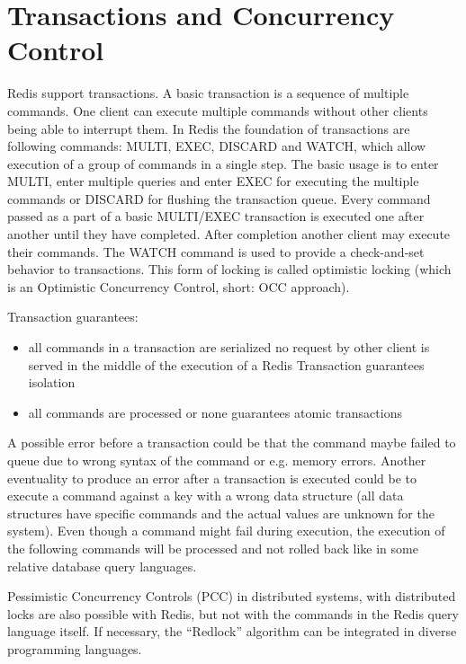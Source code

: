 \chapter{Transactions and Concurrency Control}

Redis support transactions. A basic transaction is a sequence of multiple commands. One client can execute multiple commands without other clients being able to interrupt them. In Redis the foundation of transactions are following commands: MULTI, EXEC, DISCARD and WATCH, which allow execution of a group of commands in a single step. The basic usage is to enter MULTI, enter multiple queries and enter EXEC for executing the multiple commands or  DISCARD for flushing the transaction queue. Every command passed as a part of a basic MULTI/EXEC transaction is executed one after another until they have completed. After completion another client may execute their commands. The WATCH command is used to provide a check-and-set behavior to transactions. This form of locking is called optimistic locking (which is an Optimistic Concurrency Control, short: OCC approach).

Transaction guarantees:
\begin{itemize}
	\item all commands in a transaction are serialized no request by other client is served in the middle of the execution of a Redis Transaction guarantees isolation
	\item all commands are processed or none guarantees atomic transactions
\end{itemize}

A possible error before a transaction could be that the command maybe failed to queue due to wrong syntax of the command or e.g. memory errors. Another eventuality to produce an error after a transaction is executed could be to execute a command against a key with a wrong data structure (all data structures have specific commands and the actual values are unknown for the system). Even though a command might fail during execution, the execution of the following commands will be processed and not rolled back like in some relative database query languages.

Pessimistic Concurrency Controls (PCC) in distributed systems, with distributed locks are also possible with Redis, but not with the commands in the Redis query language itself. If necessary, the “Redlock” algorithm can be integrated in diverse programming languages.
